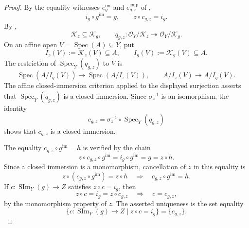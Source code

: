 \begin{proof}
  By the equality witnesses $e_g^{\mathrm{im}}$ and
  $e_{g,z}^{\mathrm{cmp}}$ of
  ,
  \[
    i_g\circ g^{\mathrm{im}}=g,
    \qquad
    z\circ c_{g,z}=i_g.
  \]
  By ,
  \[
    \mathcal K_z\subseteq\mathcal K_g,
    \qquad
    q_{g,z}\colon\mathcal O_Y/\mathcal K_z
      \twoheadrightarrow\mathcal O_Y/\mathcal K_g.
  \]
  On an affine open $V=\operatorname{Spec}(A)\subseteq Y$, put
  \[
    I_z(V):=\mathcal K_z(V)\subseteq A,
    \qquad
    I_g(V):=\mathcal K_g(V)\subseteq A.
  \]
  The restriction of $\operatorname{Spec}_Y(q_{g,z})$ to $V$ is
  \[
    \operatorname{Spec}(A/I_g(V))\longrightarrow
      \operatorname{Spec}(A/I_z(V)),
    \qquad
    A/I_z(V)\twoheadrightarrow A/I_g(V).
  \]
  The affine closed-immersion criterion applied to the displayed
  surjection asserts that $\operatorname{Spec}_Y(q_{g,z})$ is a closed
  immersion.  Since
  $\sigma_z^{-1}$ is an isomorphism, the identity
  \[
    c_{g,z}=\sigma_z^{-1}\circ\operatorname{Spec}_Y(q_{g,z})
  \]
  shows that $c_{g,z}$ is a closed immersion.

  The equality $c_{g,z}\circ g^{\mathrm{im}}=h$ is verified by the chain
  \[
    z\circ c_{g,z}\circ g^{\mathrm{im}}
      =i_g\circ g^{\mathrm{im}}
      =g
      =z\circ h.
  \]
  Since a closed immersion is a monomorphism, cancellation of $z$ in this
  equality is
  \[
    z\circ(c_{g,z}\circ g^{\mathrm{im}})=z\circ h
      \quad\Longrightarrow\quad
    c_{g,z}\circ g^{\mathrm{im}}=h.
  \]
  If $c\colon\operatorname{SIm}_Y(g)\to Z$ satisfies $z\circ c=i_g$, then
  \[
    z\circ c=i_g=z\circ c_{g,z}
      \quad\Longrightarrow\quad c=c_{g,z},
  \]
  by the monomorphism property of $z$.  The asserted uniqueness is the set
  equality
  \[
    \{c\colon\operatorname{SIm}_Y(g)\to Z\mid z\circ c=i_g\}
      =\{c_{g,z}\}.
  \]
\end{proof}

